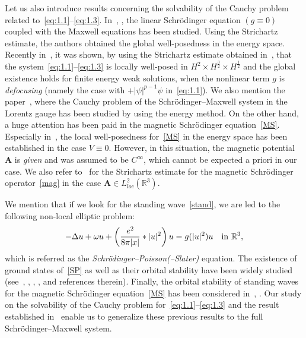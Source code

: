 \documentclass[AHL,Unicode,longabstracts]{cedram}
\newcommand{\BA}{\mathbf{A}}
\newcommand{\R}{\mathbb{R}}
\begin{document}
Let us also introduce results concerning the solvability of the Cauchy problem related to~\eqref{eq:1.1}--\eqref{eq:1.3}. In~\cite{BT}, \cite{NW}, the linear Schr\"odinger equation $(g \equiv 0)$ coupled with the Maxwell equations has been studied. Using the Strichartz estimate, the authors obtained the global well-posedness in the energy space. Recently in~\cite{AAM}, it was shown, by using the Strichartz estimate obtained in~\cite{NW}, that the system~\eqref{eq:1.1}--\eqref{eq:1.3} is locally well-posed in $H^2 \times H^{\frac{3}{2}} \times H^{\frac{1}{2}}$ and the global existence holds for finite energy weak solutions, when the nonlinear term $g$ is \emph{defocusing} (namely the case with $+|\psi|^{p-1}\psi$ in~\eqref{eq:1.1}). We also mention the paper~\cite{NT}, where the Cauchy problem of the Schr\"odinger--Maxwell system in the Lorentz gauge has been studied by using the energy method. On the other hand, a huge attention has been paid in the magnetic Schr\"odinger equation~\eqref{MS}. Especially in~\cite{M}, the local well-posedness for~\eqref{MS} in the energy space has been established in the case $V \equiv 0$. However, in this situation, the magnetic potential $\BA$ is \emph{given} and was assumed to be $C^{\infty}$, which cannot be expected a priori in our case. We also refer to~\cite{DFVV} for the Strichartz estimate for the magnetic Schr\"odinger operator~\eqref{mag} in the case $\BA \in L^2_{loc}(\R^3)$.

We mention that if we look for the standing wave~\eqref{stand}, we are led to the following non-local elliptic problem:
\begin{equation}\label{SP}
-\Delta u + \omega u + \left(\frac{e^2}{8 \pi|x|} * |u|^2 \right) u = g(|u|^2)u \quad \hbox{in} \ \R^3,
\end{equation}
which is referred as the \emph{Schr\"odinger--Poisson(--Slater)} equation. The existence of ground states of~\eqref{SP} as well as their orbital stability have been widely studied (see~\cite{AP}, \cite{BF}, \cite{BS}, \cite{CDSS}, \cite{K} and references therein). Finally, the orbital stability of standing waves for the magnetic Schr\"odinger equation~\eqref{MS} has been considered in~\cite{CE}, \cite{G}. Our study on the solvability of the Cauchy problem for~\eqref{eq:1.1}--\eqref{eq:1.3} and the result established in~\cite{CW2} enable us to generalize these previous results to the full Schr\"odinger--Maxwell system.
\end{document}
